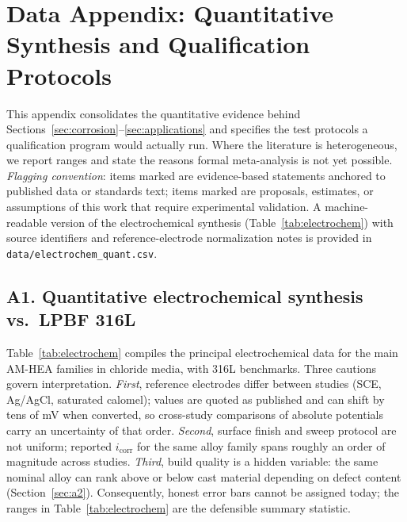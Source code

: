 \section{Data Appendix: Quantitative Synthesis and Qualification Protocols}
\label{sec:appendix}

This appendix consolidates the quantitative evidence behind Sections~\ref{sec:corrosion}--\ref{sec:applications} and specifies the test protocols a qualification program would actually run. Where the literature is heterogeneous, we report ranges and state the reasons formal meta-analysis is not yet possible. \emph{Flagging convention}: items marked \evid{} are evidence-based statements anchored to published data or standards text; items marked \prop{} are proposals, estimates, or assumptions of this work that require experimental validation. A machine-readable version of the electrochemical synthesis (Table~\ref{tab:electrochem}) with source identifiers and reference-electrode normalization notes is provided in \texttt{data/electrochem\_quant.csv}.

\subsection{A1. Quantitative electrochemical synthesis vs.\ LPBF 316L}
\label{sec:a1}

Table~\ref{tab:electrochem} compiles the principal electrochemical data for the main AM-HEA families in chloride media, with 316L benchmarks. Three cautions govern interpretation. \emph{First}, reference electrodes differ between studies (SCE, Ag/AgCl, saturated calomel); values are quoted as published and can shift by tens of mV when converted, so cross-study comparisons of absolute potentials carry an uncertainty of that order. \emph{Second}, surface finish and sweep protocol are not uniform; reported $i_{\mathrm{corr}}$ for the same alloy family spans roughly an order of magnitude across studies. \emph{Third}, build quality is a hidden variable: the same nominal alloy can rank above or below cast material depending on defect content (Section~\ref{sec:a2}). Consequently, honest error bars cannot be assigned today; the ranges in Table~\ref{tab:electrochem} are the defensible summary statistic.

